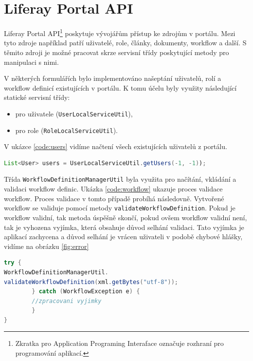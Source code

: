 \documentclass{fithesis}
\begin{document}
\section{Liferay Portal API} 
\label{sec:portal_api}
Liferay Portal API\footnote{Zkratka pro Application Programing Interaface označuje rozhraní pro programování aplikací.} poskytuje vývojářům přístup ke zdrojům v portálu. Mezi tyto zdroje například patří uživatelé, role, články, dokumenty, workflow a další. S těmito zdroji je možné pracovat skrze servisní třídy poskytující metody pro manipulaci s nimi.

V některých formulářích bylo implementováno našeptání uživatelů, rolí a workflow definicí existujících v portálu. K tomu účelu byly využity následující statické servisní třídy: 
\begin{itemize}
\item pro uživatele  (\verb|UserLocalServiceUtil|),
\item pro role (\verb|RoleLocalServiceUtil|).
\end{itemize}
V ukázce \ref{code:users} vidíme načtení všech existujících uživatelů z portálu.

\begin{lstlisting}[language=Java, float =h , caption = Načtení uživatelů z portálu , label = code:users ]
List<User> users = UserLocalServiceUtil.getUsers(-1, -1));
\end{lstlisting}

Třída \verb|WorkflowDefinitionManagerUtil| byla využita pro načítání, vkládání a validaci workflow definic. Ukázka \ref{code:workflow} ukazuje proces validace workflow. Proces validace v tomto případě probíhá následovně. Vytvořené workflow se validuje pomocí metody \verb|validateWorkflowDefinition|. Pokud je workflow validní, tak metoda úspěšně skončí, pokud ovšem workflow validní není, tak je vyhozena vyjímka, která obsahuje důvod selhání validaci. Tato vyjímka je aplikací zachycena a důvod selhání je vrácen uživateli v podobě chybové hlášky, vidíme na obrázku \ref{fig:error}

\begin{lstlisting}[language=Java, float =h , caption = Validace workflow pomocí portálového API , label = code:workflow ]
try {
WorkflowDefinitionManagerUtil.
validateWorkflowDefinition(xml.getBytes("utf-8"));
        } catch (WorkflowException e) {
        //zpracovani vyjimky
        }
}
\end{lstlisting}
\end{document}
